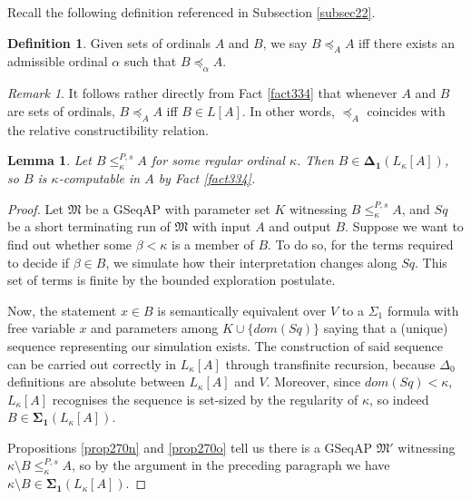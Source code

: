 \documentclass[12pt, twoside]{memoir}
\numberwithin{equation}{section}
\newtheorem{lem}[thm]{Lemma}
\theoremstyle{definition}
\newtheorem{defi}[thm]{Definition}
\theoremstyle{remark}
\newtheorem{rem}[thm]{Remark}
\theoremstyle{definition}
\theoremstyle{definition}
\theoremstyle{definition}
\theoremstyle{remark}
\begin{document}
Recall the following definition referenced in Subsection \ref{subsec22}.

\begin{defi}
Given sets of ordinals $A$ and $B$, we say $B \preceq_A A$ iff there exists an admissible ordinal $\alpha$ such that $B \preceq_{\alpha} A$.
\end{defi}

\begin{rem}\label{rem336}
It follows rather directly from Fact \ref{fact334} that whenever $A$ and $B$ are sets of ordinals, $B \preceq_A A$ iff $B \in L[A]$. In other words, $\preceq_A$ coincides with the relative constructibility relation.
\end{rem}

\begin{lem}\label{lem269}
Let $B \leq^{P, s}_{\kappa} A$ for some regular ordinal $\kappa$. Then $B \in \mathbf{\Delta_1}(L_{\kappa}[A])$, so $B$ is $\kappa$-computable in $A$ by Fact \ref{fact334}.
\end{lem}

\begin{proof}
Let $\mathfrak{M}$ be a GSeqAP with parameter set $K$ witnessing $B \leq^{P, s}_{\kappa} A$, and $Sq$ be a short terminating run of $\mathfrak{M}$ with input $A$ and output $B$. Suppose we want to find out whether some $\beta < \kappa$ is a member of $B$. To do so, for the terms required to decide if $\beta \in B$, we simulate how their interpretation changes along $Sq$. This set of terms is finite by the bounded exploration postulate. 

Now, the statement $x \in B$ is semantically equivalent over $V$ to a $\Sigma_1$ formula with free variable $x$ and parameters among $K \cup \{dom(Sq)\}$ saying that a (unique) sequence representing our simulation exists. The construction of said sequence can be carried out correctly in $L_{\kappa}[A]$ through transfinite recursion, because $\Delta_0$ definitions are absolute between $L_{\kappa}[A]$ and $V$. Moreover, since $dom(Sq)  < \kappa$, $L_{\kappa}[A]$ recognises the sequence is set-sized by the regularity of $\kappa$, so indeed $B \in \mathbf{\Sigma_1}(L_{\kappa}[A])$.

Propositions \ref{prop270n} and \ref{prop270o} tell us there is a GSeqAP $\mathfrak{M}'$ witnessing $\kappa \setminus B \leq^{P, s}_{\kappa} A$, so by the argument in the preceding paragraph we have $\kappa \setminus B \in \mathbf{\Sigma_1}(L_{\kappa}[A])$.
\end{proof}
\end{document}
